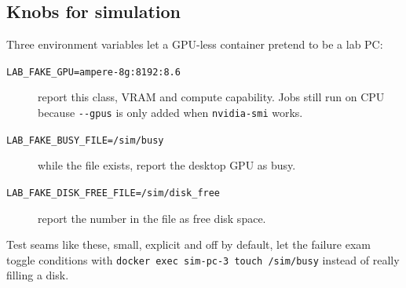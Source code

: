 \subsection{Knobs for simulation}

Three environment variables let a GPU-less container pretend to be a lab PC:

\begin{description}
\item[\texttt{LAB\_FAKE\_GPU=ampere-8g:8192:8.6}] report this class, VRAM and
  compute capability. Jobs still run on CPU because \verb|--gpus| is only
  added when \texttt{nvidia-smi} works.
\item[\texttt{LAB\_FAKE\_BUSY\_FILE=/sim/busy}] while the file exists, report
  the desktop GPU as busy.
\item[\texttt{LAB\_FAKE\_DISK\_FREE\_FILE=/sim/disk\_free}] report the number
  in the file as free disk space.
\end{description}

Test seams like these, small, explicit and off by default, let the failure
exam toggle conditions with \texttt{docker exec sim-pc-3 touch /sim/busy}
instead of really filling a disk.
